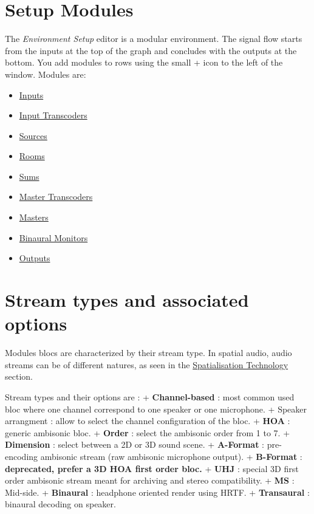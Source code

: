 \documentclass[
  letterpaper,
  DIV=11,
  numbers=noendperiod]{scrreport}
\providecommand{\tightlist}{%
  \setlength{\itemsep}{0pt}\setlength{\parskip}{0pt}}\usepackage{longtable,booktabs,array}
\begin{document}
\hypertarget{setup-modules}{%
\section{Setup Modules}\label{setup-modules}}

The \emph{Environment Setup} editor is a modular environment. The signal
flow starts from the inputs at the top of the graph and concludes with
the outputs at the bottom. You add modules to rows using the small +
icon to the left of the window. Modules are:

\begin{itemize}
\tightlist
\item
  \href{Spat_Environment_Input_Modules.md}{Inputs}
\item
  \href{Spat_Environment_Input_Transcoder_Modules.md}{Input Transcoders}
\item
  \href{Spat_Environment_Source_Room_Modules.md}{Sources}
\item
  \href{Spat_Environment_Source_Room_Modules.md}{Rooms}
\item
  \href{Spat_Environment_Master_Section_Modules.md}{Sums}
\item
  \href{Spat_Environment_Master_Section_Modules.md}{Master Transcoders}
\item
  \href{Spat_Environment_Master_Section_Modules.md}{Masters}
\item
  \href{Spat_Environment_Master_Section_Modules.md}{Binaural Monitors}
\item
  \href{Spat_Environment_Output_Modules.md}{Outputs}
\end{itemize}

\hypertarget{stream-types-and-associated-options}{%
\section{Stream types and associated
options}\label{stream-types-and-associated-options}}

Modules blocs are characterized by their stream type. In spatial audio,
audio streams can be of different natures, as seen in the
\href{}{Spatialisation Technology} section.

Stream types and their options are : + \textbf{Channel-based} : most
common used bloc where one channel correspond to one speaker or one
microphone. + Speaker arrangment : allow to select the channel
configuration of the bloc. + \textbf{HOA} : generic ambisonic bloc. +
\textbf{Order} : select the ambisonic order from 1 to 7. +
\textbf{Dimension} : select between a 2D or 3D sound scene. +
\textbf{A-Format} : pre-encoding ambisonic stream (raw ambisonic
microphone output). + \textbf{B-Format} : \textbf{deprecated, prefer a
3D HOA first order bloc.} + \textbf{UHJ} : special 3D first order
ambisonic stream meant for archiving and stereo compatibility. +
\textbf{MS} : Mid-side. + \textbf{Binaural} : headphone oriented render
using HRTF. + \textbf{Transaural} : binaural decoding on speaker.
\end{document}
